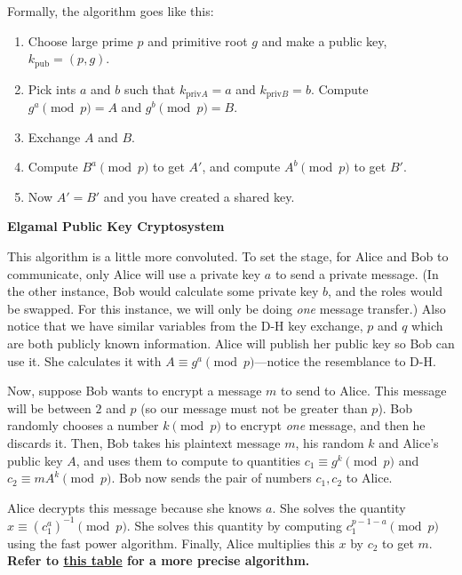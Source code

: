 Formally, the algorithm goes like this:

\begin{enumerate}
    \item Choose large prime \(p\) and primitive root \(g\) and make a public key, \(k_{\text{pub}} = (p,g)\).
    \item Pick ints \(a\) and \(b\) such that \(k_{\text{priv} A} = a\) and \(k_{\text{priv} B} = b\). Compute \(g^a \pmod{p} = A\) and \(g^b \pmod{p} = B\).
    \item Exchange \(A\) and \(B\).
    \item Compute \(B^a \pmod{p}\) to get \(A'\), and compute \(A^b \pmod{p}\) to get \(B'\).
    \item Now \(A' = B'\) and you have created a shared key.
\end{enumerate}


\begin{center}
    \textbf{Elgamal Public Key Cryptosystem}
\end{center}

This algorithm is a little more convoluted. To set the stage, for Alice and Bob to communicate, only Alice will use a private key \(a\) to send a private message. (In the other instance, Bob would calculate some private key \(b\), and the roles would be swapped. For this instance, we will only be  doing \textit{one} message transfer.) Also notice that we have similar variables from the D-H key exchange, \(p\) and \(q\) which are both publicly known information. Alice will publish her public key so Bob can use it. She calculates it with \(A \equiv g^a \pmod{p}\)---notice the resemblance to D-H.

Now, suppose Bob wants to encrypt a message \(m\) to send to Alice. This message will be between \(2\) and \(p\) (so our message must not be greater than \(p\)). Bob randomly chooses a number \(k \pmod{p}\) to encrypt \textit{one} message, and then he discards it. Then, Bob takes his plaintext message \(m\), his random \(k\) and Alice's public key \(A\), and uses them to compute to quantities \(c_1 \equiv g^k \pmod{p}\) and \(c_2 \equiv mA^k \pmod{p}\). Bob now sends the pair of numbers \(c_1, c_2\) to Alice.

Alice decrypts this message because she knows \(a\). She solves the quantity \(x \equiv (c^a_1)^{-1} \pmod{p}\). She solves this quantity by computing \(c^{p - 1 - a}_1 \pmod{p}\) using the fast power algorithm. Finally, Alice multiplies this \(x\) by \(c_2\) to get \(m\). \textbf{Refer to \hyperlink{Elgamal}{this table} for a more precise algorithm.}

